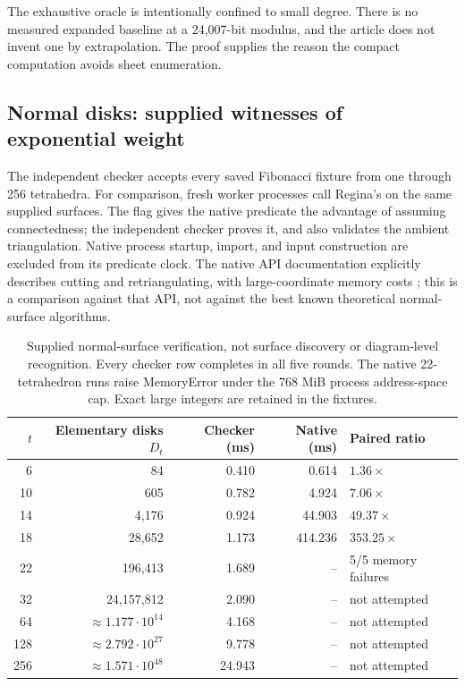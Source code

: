The exhaustive oracle is intentionally confined to small degree. There is
no measured expanded baseline at a 24,007-bit modulus, and the article
does not invent one by extrapolation. The proof supplies the reason the
compact computation avoids sheet enumeration.

\subsection{Normal disks: supplied witnesses of exponential weight}

The independent checker accepts every saved Fibonacci fixture from one
through 256 tetrahedra. For comparison, fresh worker processes call
Regina's  on the same supplied surfaces.
The flag gives the native predicate the advantage of assuming connectedness;
the independent checker proves it, and also validates the ambient
triangulation. Native process startup, import, and input construction are
excluded from its predicate clock. The native API documentation explicitly
describes cutting and retriangulating, with large-coordinate memory costs
\cite{regina}; this is a comparison against that API, not against the
best known theoretical normal-surface algorithms.

\begin{table}[htbp]
\centering\small
\begin{tabular}{@{}rrrrl@{}}
\toprule
$t$ & Elementary disks $D_t$ & Checker (ms) & Native (ms) & Paired ratio\\
\midrule
6 & 84 & 0.410 & 0.614 & $1.36\times$\\
10 & 605 & 0.782 & 4.924 & $7.06\times$\\
14 & 4,176 & 0.924 & 44.903 & $49.37\times$\\
18 & 28,652 & 1.173 & 414.236 & $353.25\times$\\
22 & 196,413 & 1.689 & -- & 5/5 memory failures\\
32 & 24,157,812 & 2.090 & -- & not attempted\\
64 & $\approx1.177\cdot10^{14}$ & 4.168 & -- & not attempted\\
128 & $\approx2.792\cdot10^{27}$ & 9.778 & -- & not attempted\\
256 & $\approx1.571\cdot10^{48}$ & 24.943 & -- & not attempted\\
\bottomrule
\end{tabular}
\caption{Supplied normal-surface verification, not surface discovery or
diagram-level recognition. Every checker row completes in all five rounds.
The native 22-tetrahedron runs raise MemoryError under the 768 MiB process
address-space cap. Exact large integers are retained in the fixtures.}
\label{tab:normal}
\end{table}

